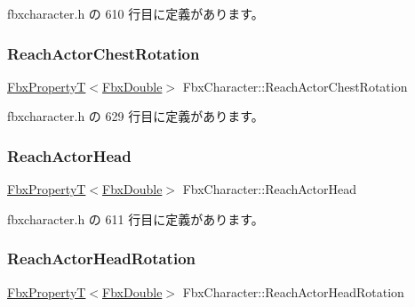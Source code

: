  fbxcharacter.\+h の 610 行目に定義があります。

\mbox{\label{class_fbx_character_a448705b8ffd45a455d42c9eb5be13260}} 
\subsubsection{\texorpdfstring{Reach\+Actor\+Chest\+Rotation}{ReachActorChestRotation}}
{\footnotesize\ttfamily \hyperlink{class_fbx_property_t}{Fbx\+PropertyT}$<$\hyperlink{fbxtypes_8h_a171e72a1c46fc15c1a6c9c31948c1c5b}{Fbx\+Double}$>$ Fbx\+Character\+::\+Reach\+Actor\+Chest\+Rotation}



 fbxcharacter.\+h の 629 行目に定義があります。

\mbox{\label{class_fbx_character_abeb245801df829149e54ee3b291a79d4}} 
\subsubsection{\texorpdfstring{Reach\+Actor\+Head}{ReachActorHead}}
{\footnotesize\ttfamily \hyperlink{class_fbx_property_t}{Fbx\+PropertyT}$<$\hyperlink{fbxtypes_8h_a171e72a1c46fc15c1a6c9c31948c1c5b}{Fbx\+Double}$>$ Fbx\+Character\+::\+Reach\+Actor\+Head}



 fbxcharacter.\+h の 611 行目に定義があります。

\mbox{\label{class_fbx_character_a91a5548a937b1b3892bb36cd6d6324ae}} 
\subsubsection{\texorpdfstring{Reach\+Actor\+Head\+Rotation}{ReachActorHeadRotation}}
{\footnotesize\ttfamily \hyperlink{class_fbx_property_t}{Fbx\+PropertyT}$<$\hyperlink{fbxtypes_8h_a171e72a1c46fc15c1a6c9c31948c1c5b}{Fbx\+Double}$>$ Fbx\+Character\+::\+Reach\+Actor\+Head\+Rotation}



